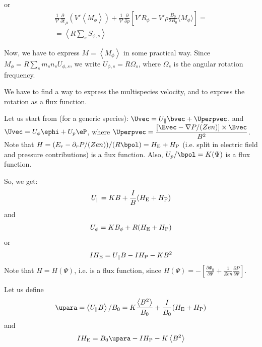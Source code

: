 or
\begin{eqnarray}
\frac{1}{V'} \frac{\partial }{\partial{t}}_{\rho}\left(V' \left\langle M_\phi \right\rangle\right) +\frac{1}{V'}  \frac{\partial}{\partial \rho}\left[ V' R_{\phi}
-V'\rho\frac{\dot{B}_0}{2 B_0}\langle  M_\phi \rangle \right]
=\nonumber \\
=\left\langle R \sum_s S_{\phi,s}\right\rangle
\label{momtranspeq3drephiFSArho}
\end{eqnarray}

Now, we have to express $M= \left\langle M_\phi \right\rangle$ in some practical way. Since $\displaystyle  M_\phi = R \sum_s m_s n_s U_{\phi,s}$, we write $U_{\phi,s}=R\Omega_s$, where $\Omega_s$ is the angular rotation frequency.

We have to find a way to express the multispecies velocity, and to express the rotation as a flux function.

Let us start from (for a generic species): $\Uvec=U_\parallel \bvec+\Uperpvec$, and $\Uvec=U_\phi \ephi + U_p \eP$, where
$\displaystyle \Uperpvec=\frac{\left[\Evec-\nabla{P}/(Zen)\right]\times\Bvec}{B^2}$.
Note that $H=(E_r-\partial_r P /(Zen))/(R \bpol)=H_{\rm E}+H_{\rm P}$ (i.e. split in electric field and pressure contributions) is a flux function. Also, $U_p/\bpol=K(\Psi)$ is a flux function.

So, we get:
\begin{eqnarray}
U_\parallel = K B + \frac{I}{B} (H_{\rm E}+H_{\rm P})
\label{uparperp1}
\end{eqnarray}
and
\begin{eqnarray}
U_\phi = K B_\phi + R (H_{\rm E}+H_{\rm P})
\label{uparperp1}
\end{eqnarray}
or
\begin{eqnarray}
 I H_{\rm E}=U_\parallel B-I  H_{\rm P}-K B^2
\label{uparperp2}
\end{eqnarray}
Note that $H = H(\Psi)$, i.e. is a flux function, since $\displaystyle H(\Psi)=-\left[\frac{\partial\Phi_0}{\partial \Psi}+\frac{1}{Zen}\frac{\partial{P}}{\partial{\Psi}}\right]$.

Let us define
\begin{eqnarray}
\upara=\left\langle U_\parallel B \right\rangle/B_0 = K \frac{\left\langle B^2 \right\rangle}{B_0}+\frac{I}{B_0}(H_{\rm E}+H_{\rm P})
\label{uparfsadef}
\end{eqnarray}
and
\begin{eqnarray}
 I H_{\rm E}=B_0 \upara-I  H_{\rm P}-K \left\langle B^2 \right\rangle
\label{uparfsadef2}
\end{eqnarray}

